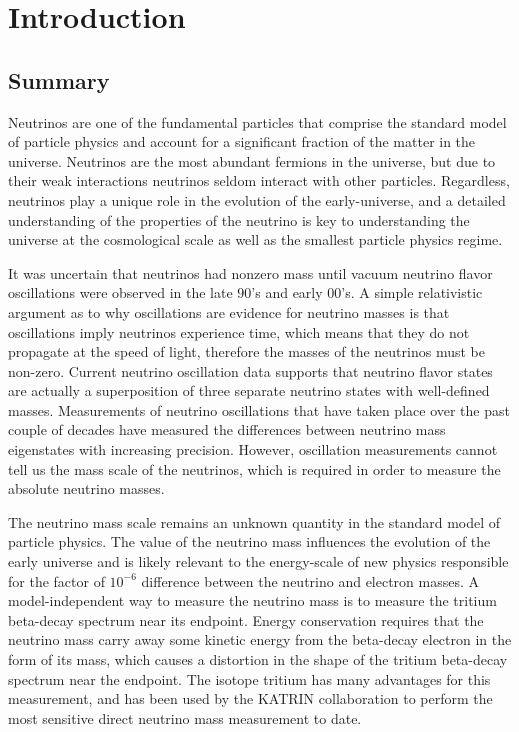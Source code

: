 
\chapter{Introduction} 
\label{chap:introduction}

\section{Summary}

Neutrinos are one of the fundamental particles that comprise the standard model of particle physics and account for a significant fraction of the matter in the universe. Neutrinos are the most abundant fermions in the universe, but due to their weak interactions neutrinos seldom interact with other particles. Regardless, neutrinos play a unique role in the evolution of the early-universe, and a detailed understanding of the properties of the neutrino is key to understanding the universe at the cosmological scale as well as the smallest particle physics regime.

It was uncertain that neutrinos had nonzero mass until vacuum neutrino flavor oscillations were observed in the late 90's and early 00's. A simple relativistic argument as to why oscillations are evidence for neutrino masses is that oscillations imply neutrinos experience time, which means that they do not propagate at the speed of light, therefore the masses of the neutrinos must be non-zero. Current neutrino oscillation data supports that neutrino flavor states are actually a superposition of three separate neutrino states with well-defined masses. Measurements of neutrino oscillations that have taken place over the past couple of decades have measured the differences between neutrino mass eigenstates with increasing precision. However, oscillation measurements cannot tell us the mass scale of the neutrinos, which is required in order to measure the absolute neutrino masses.

The neutrino mass scale remains an unknown quantity in the standard model of particle physics. The value of the neutrino mass influences the evolution of the early universe and is likely relevant to the energy-scale of new physics responsible for the factor of $10^{-6}$ difference between the neutrino and electron masses. A model-independent way to measure the neutrino mass is to measure the tritium beta-decay spectrum near its endpoint. Energy conservation requires that the neutrino mass carry away some kinetic energy from the beta-decay electron in the form of its mass, which causes a distortion in the shape of the tritium beta-decay spectrum near the endpoint. The isotope tritium has many advantages for this measurement, and has been used by the KATRIN collaboration to perform the most sensitive direct neutrino mass measurement to date.

